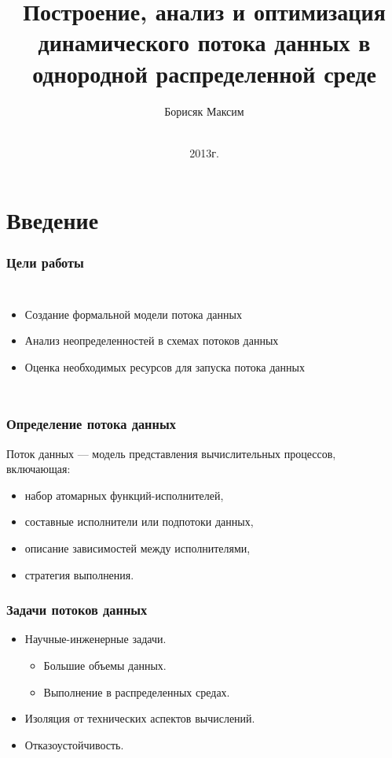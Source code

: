 \documentclass[10pt,pdf,hyperref={unicode}]{beamer}
\title{Построение, анализ и оптимизация динамического потока данных в однородной распределенной среде}
\author{Борисяк Максим}
\institute{МФТИ (ГУ)
}
\date{
    \\
    2013г.
}
\begin{document}
\begin{frame}
  \maketitle
\end{frame}

\section{Введение}

\begin{frame}
  \frametitle{Цели работы}
 \begin{columns}
    \column{\textwidth}
     \begin{itemize}
        \item Создание формальной модели потока данных
        \item Анализ неопределенностей в схемах потоков данных
        \item Оценка необходимых ресурсов для запуска потока данных
    \end{itemize}
\end{columns}
\end{frame}

\begin{frame}
  \frametitle{Определение потока данных}
  Поток данных --- модель представления вычислительных процессов, включающая:
  \begin{itemize}
    \item набор атомарных функций-исполнителей,
    \item составные исполнители или подпотоки данных,
    \item описание зависимостей между исполнителями,
    \item стратегия выполнения.
  \end{itemize}
\end{frame}

\begin{frame}
  \frametitle{Задачи потоков данных}
  \begin{itemize}
    \item Научные-инженерные задачи.
    \begin{itemize}
      \item Большие объемы данных.
      \item Выполнение в распределенных средах.
    \end{itemize}
    \item Изоляция от технических аспектов вычислений.
    \item Отказоустойчивость.
  \end{itemize}
\end{frame}
\end{document}
